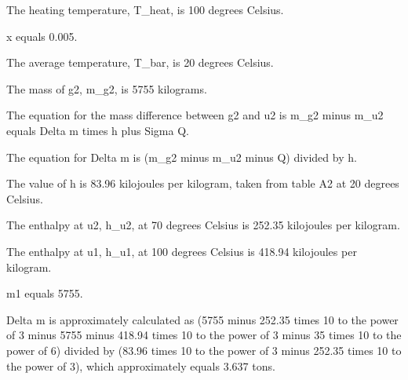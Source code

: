 The heating temperature, T_heat, is 100 degrees Celsius.

x equals 0.005.

The average temperature, T_bar, is 20 degrees Celsius.

The mass of g2, m_g2, is 5755 kilograms.

The equation for the mass difference between g2 and u2 is m_g2 minus m_u2 equals Delta m times h plus Sigma Q.

The equation for Delta m is (m_g2 minus m_u2 minus Q) divided by h.

The value of h is 83.96 kilojoules per kilogram, taken from table A2 at 20 degrees Celsius.

The enthalpy at u2, h_u2, at 70 degrees Celsius is 252.35 kilojoules per kilogram.

The enthalpy at u1, h_u1, at 100 degrees Celsius is 418.94 kilojoules per kilogram.

m1 equals 5755.

Delta m is approximately calculated as (5755 minus 252.35 times 10 to the power of 3 minus 5755 minus 418.94 times 10 to the power of 3 minus 35 times 10 to the power of 6) divided by (83.96 times 10 to the power of 3 minus 252.35 times 10 to the power of 3), which approximately equals 3.637 tons.